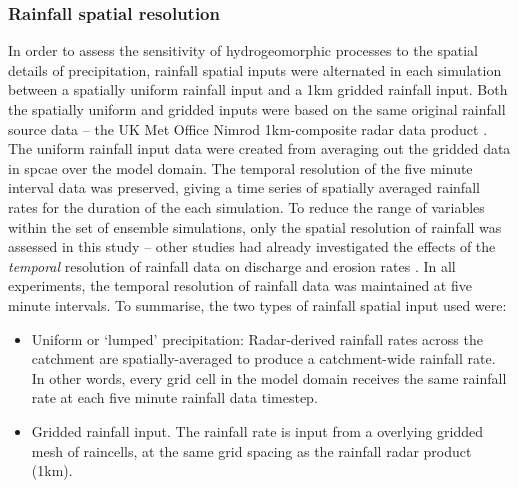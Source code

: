 \subsubsection{Rainfall spatial resolution}
In order to assess the sensitivity of hydrogeomorphic processes to the spatial details of precipitation, rainfall spatial inputs were alternated in each simulation between a spatially uniform rainfall input and a 1km gridded rainfall input. Both the spatially uniform and gridded inputs were based on the same original rainfall source data -- the UK Met Office Nimrod 1km-composite radar data product \citep{metoffice2003nimrod}. The uniform rainfall input data were created from averaging out the gridded data in spcae over the model domain. The temporal resolution of the five minute interval data was preserved, giving a time series of spatially averaged rainfall rates for the duration of the each simulation. To reduce the range of variables within the set of ensemble simulations, only the spatial resolution of rainfall was assessed in this study -- other studies had already investigated the effects of the \textit{temporal} resolution of rainfall data on discharge and erosion rates \citep{nicotina2008impact,Coulthard2013,coulthard2016sensitivity}. In all experiments, the temporal resolution of rainfall data was maintained at five minute intervals. To summarise, the two types of rainfall spatial input used were: 

\begin{itemize}
\item Uniform or `lumped' precipitation: Radar-derived rainfall rates across the catchment are spatially-averaged to produce a catchment-wide rainfall rate. In other words, every grid cell in the model domain receives the same rainfall rate at each five minute rainfall data timestep.
\item Gridded rainfall input. The rainfall rate is input from a overlying gridded mesh of raincells, at the same grid spacing as the rainfall radar product (1km).
\end{itemize}


